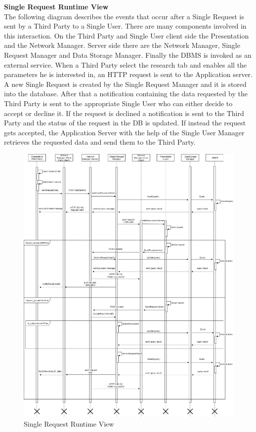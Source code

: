 \documentclass[titlepage]{article}
\begin{document}
{\bf Single Request Runtime View }\\ 
The following diagram describes the events that occur after a Single Request is sent by a Third Party to a Single User. There are many components involved in this interaction. On the Third Party and Single User client side the Presentation and the Network Manager. Server side there are the Network Manager, Single Request Manager and Data Storage Manager. Finally the DBMS is invoked as an external service.
When a Third Party select the research tab and enables all the parameters he is interested in, an HTTP request is sent to the Application server. A new Single Request is created by the Single Request Manager and it is stored into the database. After that a notification containing the data requested by the Third Party is sent to the appropriate Single User who can either decide to accept or decline it. If the request is declined a notification is sent to the Third Party and the status of the request in the DB is updated. If instead the request gets accepted, the Application Server with the help of the Single User Manager retrieves the requested data and send them to the Third Party.

\begin{figure}[H]
	\center
  	\includegraphics[width=15cm]{SingleRequest.png}
  	\caption{Single Request Runtime View}
 	\label{fig:SIGREQ}
\end{figure}
\end{document}
